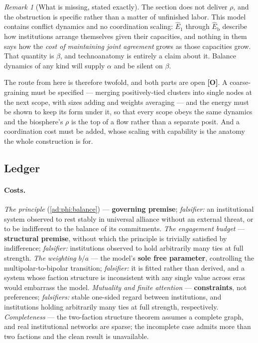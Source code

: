 \documentclass[11pt]{article}
\numberwithin{equation}{section}
\theoremstyle{plain}
\theoremstyle{definition}
\theoremstyle{remark}
\newtheorem{remark}[theorem]{Remark}
\begin{document}
\begin{remark}[What is missing, stated exactly]\label{ad:rem:missing}
The section does not deliver $\rho$, and the obstruction is specific
rather than a matter of unfinished labor. This model contains conflict
dynamics and no coordination scaling: $\hat E_1$ through
$\hat E_{\mathrm b}$ describe how institutions arrange themselves given
their capacities, and nothing in them says how the \emph{cost of
maintaining joint agreement} grows as those capacities grow. That
quantity is $\beta$, and technoanatomy is entirely a claim about it.
Balance dynamics of any kind will supply $\alpha$ and be silent on
$\beta$.

The route from here is therefore twofold, and both parts are open
\textbf{[O]}. A coarse-graining must be specified --- merging
positively-tied clusters into single nodes at the next scope, with sizes
adding and weights averaging --- and the energy must be shown to keep
its form under it, so that every scope obeys the same dynamics and the
biosphere's $\rho$ is the top of a flow rather than a separate
posit. And a coordination cost must be added, whose scaling with
capability is the anatomy the whole construction is for.
\end{remark}

\subsection{Ledger}\label{ad:sub:ledger}

\paragraph{Costs.} \emph{The principle} (\ref{ad:phi:balance}) ---
\textbf{governing premise}; \emph{falsifier:} an institutional system
observed to rest stably in universal alliance without an external
threat, or to be indifferent to the balance of its commitments.
\emph{The engagement budget} --- \textbf{structural premise}, without
which the principle is trivially satisfied by indifference;
\emph{falsifier:} institutions observed to hold arbitrarily many ties
at full strength. \emph{The weighting $b/a$} --- the model's \textbf{sole free
parameter}, controlling the multipolar-to-bipolar transition;
\emph{falsifier:} it is fitted rather than derived, and a system whose
faction structure is inconsistent with any single value across eras
would embarrass the model. \emph{Mutuality and finite attention} ---
\textbf{constraints}, not preferences; \emph{falsifiers:} stable
one-sided regard between institutions, and institutions holding
arbitrarily many ties at full strength, respectively. \emph{Completeness} --- the two-faction
structure theorem assumes a complete graph, and real institutional
networks are sparse; the incomplete case admits more than two factions
and the clean result is unavailable.
\end{document}
